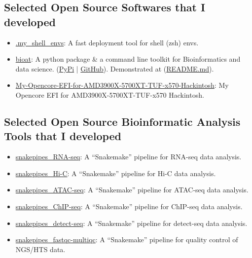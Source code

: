 \subsection*{\textbf{Selected Open Source Softwares that I developed}}
\begin{itemize}
    \item \href{https://github.com/hermanzhaozzzz/.my_shell_envs}{.my\_shell\_envs}: A fast deployment tool for shell (zsh) envs.
    \item \href{https://github.com/hermanzhaozzzz/bioat}{bioat}: A python package \& a command line toolkit for Bioinformatics and data science. (\href{https://pypi.org/project/bioat/}{PyPi} | \href{https://github.com/hermanzhaozzzz/bioat}{GitHub}). Demonstrated at (\href{https://github.com/hermanzhaozzzz/bioat}{README.md}).
    \item \href{https://github.com/hermanzhaozzzz/My-Opencore-EFI-for-AMD3900X-5700XT-TUF-x570-Hackintosh}{My-Opencore-EFI-for-AMD3900X-5700XT-TUF-x570-Hackintosh}: My Opencore EFI for AMD3900X-5700XT-TUF-x570 Hackintosh.
\end{itemize}

\subsection*{\textbf{Selected Open Source Bioinformatic Analysis Tools that I developed}}
\begin{itemize}
    \item \href{https://github.com/hermanzhaozzzz/snakepipes_RNA-seq}{snakepipes\_RNA-seq}: A ``Snakemake'' pipeline for RNA-seq data analysis.
    \item \href{https://github.com/hermanzhaozzzz/snakepipes_Hi-C}{snakepipes\_Hi-C}: A ``Snakemake'' pipeline for Hi-C data analysis.
    \item \href{https://github.com/hermanzhaozzzz/snakepipes_ATAC-seq}{snakepipes\_ATAC-seq}: A ``Snakemake'' pipeline for ATAC-seq data analysis.
    \item \href{https://github.com/hermanzhaozzzz/snakepipes_ChIP-seq}{snakepipes\_ChIP-seq}: A ``Snakemake'' pipeline for ChIP-seq data analysis.
    \item \href{https://github.com/hermanzhaozzzz/snakepipes_detect-seq}{snakepipes\_detect-seq}: A ``Snakemake'' pipeline for detect-seq data analysis.
    \item \href{https://github.com/hermanzhaozzzz/snakepipes_fastqc-multiqc}{snakepipes\_fastqc-multiqc}: A ``Snakemake'' pipeline for quality control of NGS/HTS data.
\end{itemize}

